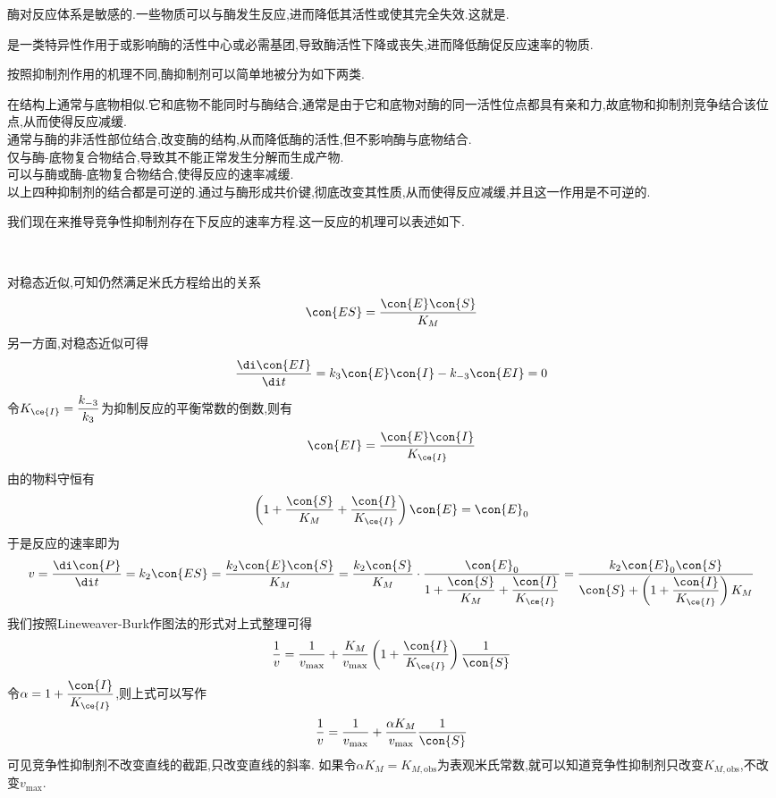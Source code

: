 \documentclass{ctexart}
\begin{document}
\indent 酶对反应体系是敏感的.一些物质可以与酶发生反应,进而降低其活性或使其完全失效.这就是.
\begin{definition}[7D.3.3 抑制剂]
    是一类特异性作用于或影响酶的活性中心或必需基团,导致酶活性下降或丧失,进而降低酶促反应速率的物质.
\end{definition}
按照抑制剂作用的机理不同,酶抑制剂可以简单地被分为如下两类.
\begin{definition}[7D.3.4 抑制剂的分类]
    在结构上通常与底物相似.它和底物不能同时与酶结合,通常是由于它和底物对酶的同一活性位点都具有亲和力,故底物和抑制剂竞争结合该位点,从而使得反应减缓.\\
    通常与酶的非活性部位结合,改变酶的结构,从而降低酶的活性,但不影响酶与底物结合.\\
    仅与酶-底物复合物结合,导致其不能正常发生分解而生成产物.\\
    可以与酶或酶-底物复合物结合,使得反应的速率减缓.\\
    以上四种抑制剂的结合都是可逆的.通过与酶形成共价键,彻底改变其性质,从而使得反应减缓,并且这一作用是不可逆的.
\end{definition}
我们现在来推导竞争性抑制剂存在下反应的速率方程.这一反应的机理可以表述如下.
\begin{tightcenter}
    \\
\end{tightcenter}
\begin{derivation}
    对稳态近似,可知仍然满足米氏方程给出的关系
    \[\con{ES}=\dfrac{\con{E}\con{S}}{K_{M}}\]
    另一方面,对稳态近似可得
    \[\dfrac{\di\con{EI}}{\di t}=k_3\con{E}\con{I}-k_{-3}\con{EI}=0\]
    令$K_{\ce{I}}=\dfrac{k_{-3}}{k_{3}}$为抑制反应的平衡常数的倒数,则有
    \[\con{EI}=\dfrac{\con{E}\con{I}}{K_{\ce{I}}}\]
    由的物料守恒有
    \[\left(1+\dfrac{\con{S}}{K_{M}}+\dfrac{\con{I}}{K_{\ce{I}}}\right)\con{E}=\con{E}_0\]
    于是反应的速率即为
    \[v
    = \dfrac{\di\con{P}}{\di t}=k_2\con{ES}=\dfrac{k_2\con{E}\con{S}}{K_{M}}
    = \dfrac{k_2\con{S}}{K_{M}}\cdot\dfrac{\con{E}_0}{1+\dfrac{\con{S}}{K_{M}}+\dfrac{\con{I}}{K_{\ce{I}}}}
    = \dfrac{k_2\con{E}_0\con{S}}{\con{S}+\left(1+\dfrac{\con{I}}{K_{\ce{I}}}\right)K_{M}}\]
    我们按照Lineweaver-Burk作图法的形式对上式整理可得
    \[\dfrac{1}{v}=\dfrac{1}{v_{\max}}+\dfrac{K_{M}}{v_{\max}}\left(1+\dfrac{\con{I}}{K_{\ce{I}}}\right)\dfrac{1}{\con{S}}\]
    令$\alpha=1+\dfrac{\con{I}}{K_{\ce{I}}}$,则上式可以写作
    \[\dfrac{1}{v}=\dfrac{1}{v_{\max}}+\dfrac{\alpha K_{M}}{v_{\max}}\dfrac{1}{\con{S}}\]
    可见竞争性抑制剂不改变直线的截距,只改变直线的斜率.%
    如果令$\alpha K_M=K_{M,\text{obs}}$为表观米氏常数,就可以知道竞争性抑制剂只改变$K_{M,\text{obs}}$,不改变$v_{\max}$.
\end{derivation}
\end{document}
